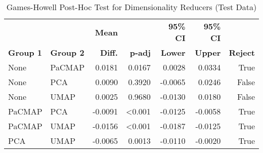 \begin{table}[h!]
    \captionsetup{skip=5pt}
\centering
\caption{Games-Howell Post-Hoc Test for Dimensionality Reducers (Test Data)}
\label{tbl:games_howell_dim_reducer_full}
        \begin{tabular}{llrrrrr}
            \toprule
             &  & \textbf{Mean} &  & \textbf{95\% CI} & \textbf{95\% CI} & \\
            \textbf{Group 1} & \textbf{Group 2} & \textbf{Diff.} & \textbf{p-adj} & \textbf{Lower} & \textbf{Upper} & \textbf{Reject}\\
\midrule
None & PaCMAP & 0.0181 & 0.0167 & 0.0028 & 0.0334 & True \\
None & PCA & 0.0090 & 0.3920 & -0.0065 & 0.0246 & False \\
None & UMAP & 0.0025 & 0.9680 & -0.0130 & 0.0180 & False \\
PaCMAP & PCA & -0.0091 & <0.001 & -0.0125 & -0.0058 & True \\
PaCMAP & UMAP & -0.0156 & <0.001 & -0.0187 & -0.0125 & True \\
PCA & UMAP & -0.0065 & 0.0013 & -0.0110 & -0.0020 & True \\
\bottomrule
\end{tabular}
\end{table}

\begin{table}[h!]
    \captionsetup{skip=5pt}
\centering
\caption{Descriptive Statistics for F1-Scores by Number of Dimensions (Test Data)}
\label{tbl:desc_stats_num_dim}
\end{table}

